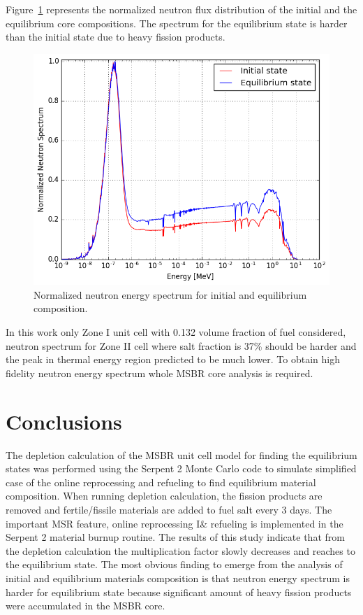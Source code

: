 \documentclass{anstrans}
\begin{document}
Figure~\ref{fig:spectrum} represents the normalized neutron flux distribution 
of the initial and the equilibrium core compositions. The spectrum for the 
equilibrium state is harder than the initial state due to heavy fission 
products.  
\begin{figure}[htbp!] %
        \centering
        \includegraphics[width=1.04\linewidth]{spectrum.png}
        \caption{Normalized neutron energy spectrum for initial and equilibrium 
        composition.}
        \label{fig:spectrum}
\end{figure}

\FloatBarrier 

In this work only Zone I unit cell with 0.132 volume fraction of fuel 
considered, neutron spectrum for Zone II cell where salt fraction is 37\% 
should be harder and the peak in thermal energy region predicted to be much 
lower. To obtain high fidelity neutron energy spectrum whole \gls{MSBR} core 
analysis is required.
\section{Conclusions}
The depletion calculation of the \gls{MSBR} unit cell model for finding the 
equilibrium states was performed using the Serpent 2 Monte Carlo code to 
simulate simplified case of the online reprocessing and refueling to find 
equilibrium material composition. When running depletion calculation, the 
fission products are removed and fertile/fissile materials are added to fuel 
salt every 3 days. The important MSR feature, online reprocessing I\& refueling 
is implemented in the Serpent 2 material burnup routine. The results of this 
study indicate that from the depletion calculation the multiplication factor 
slowly decreases and reaches to the equilibrium state. The most obvious finding 
to emerge from the analysis of initial and equilibrium materials composition is 
that neutron energy spectrum is harder for equilibrium state because 
significant amount of heavy fission products were accumulated in the \gls{MSBR} 
core.
\end{document}
